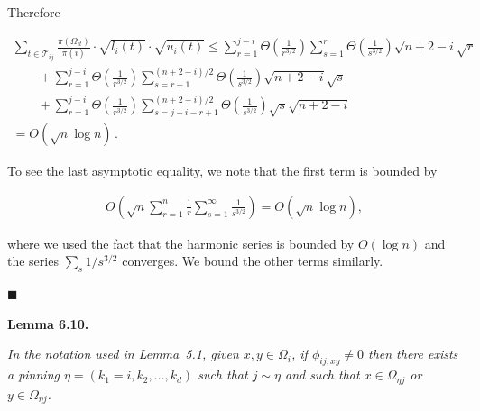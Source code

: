Therefore\par


\[\begin{gathered}
\displaystyle\sum_{t\in\mathcal{T}_{ij}}\frac{\pi(\Omega_{it})}{\hat{\pi}(i)}\cdot\sqrt{l_{i}(t)}\cdot\sqrt{u_{i}(t)} \displaystyle\leq\sum_{r=1}^{j-i}\Theta\left(\frac{1}{r^{3/2}}\right)\sum_{s=1}^{r}\Theta\left(\frac{1}{s^{3/2}}\right)\sqrt{n+2-i}\sqrt{r} \\
\displaystyle\qquad+\sum_{r=1}^{j-i}\Theta\left(\frac{1}{r^{3/2}}\right)\sum_{s=r+1}^{(n+2-i)/2}\Theta\left(\frac{1}{s^{3/2}}\right)\sqrt{n+2-i}\sqrt{s} \\
\displaystyle\qquad+\sum_{r=1}^{j-i}\Theta\left(\frac{1}{r^{3/2}}\right)\sum_{s=j-i-r+1}^{(n+2-i)/2}\Theta\left(\frac{1}{s^{3/2}}\right)\sqrt{s}\sqrt{n+2-i} \\
\displaystyle=O\left(\sqrt{n}\log n\right)\,.
\end{gathered}\]


To see the last asymptotic equality, we note that the first term is bounded by\par


\[\begin{gathered}
O\left(\sqrt{n}\sum_{r=1}^{n}\frac{1}{r}\sum_{s=1}^{\infty}\frac{1}{s^{3/2}}\right)=O(\sqrt{n}\log n),
\end{gathered}\]


where we used the fact that the harmonic series is bounded by $O(\log n)$ and the series $\sum_{s}1/s^{3/2}$ converges. We bound the other terms similarly.\par




\ensuremath{\blacksquare}\par






\par\medskip\noindent\textbf{\textbf{Lemma 6.10}\textbf{.}}\par



\emph{In the notation used in Lemma 5.1, given $x,y\in\Omega_{i}$, if $\phi_{ij,xy}\neq 0$ then there exists a pinning $\eta=(k_{1}=i,k_{2},\dots,k_{d})$ such that $j\sim\eta$ and such that $x\in\Omega_{\eta j}$ or $y\in\Omega_{\eta j}$.}\par






